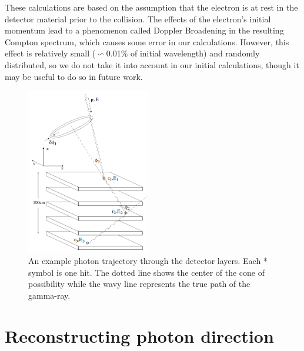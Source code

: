These calculations are based on the assumption that the electron is at rest in the detector material prior to the collision. The effects of the electron's initial momentum lead to a phenomenon called Doppler Broadening in the resulting Compton spectrum, which causes some error in our calculations. However, this effect is relatively small ($\backsim$0.01\% of initial wavelength) and randomly distributed, so we do not take it into account in our initial calculations, though it may be useful to do so in future work.


\begin{figure}
    \centering
    \includegraphics[width=0.48\textwidth]{detector_scattering.PNG}
    \caption{An example photon trajectory through the detector layers. Each * symbol is one hit. The dotted line shows the center of the cone of possibility while the wavy line represents the true path of the gamma-ray. \cite{comptonThesis}}
    \label{fig:scatters}
\end{figure}

\section{Reconstructing photon direction}


